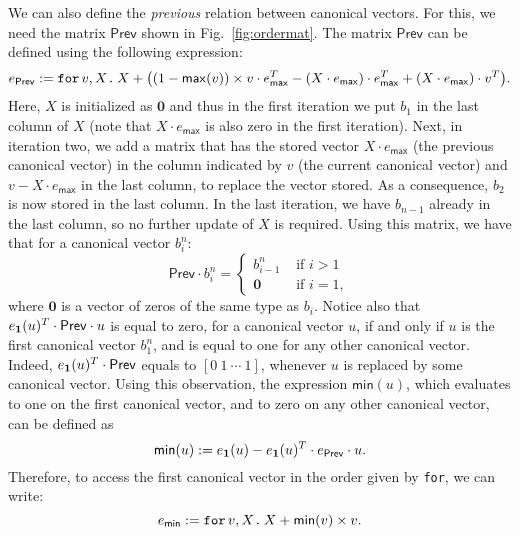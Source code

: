 We can also define the \textit{previous} relation between canonical vectors. For this, we need
the matrix $\mathsf{Prev}$ shown in Fig.~\ref{fig:ordermat}.
The matrix 
$\mathsf{Prev}$ can be defined using the following \langfor expression:
$$e_{\mathsf{Prev}}:= \texttt{for}\, v,X \texttt{.}\, X + \bigl((1 - \mathsf{max}(v))\times v\cdot e_{\mathsf{max}}^T - (X\cdot e_{\mathsf{max}})\cdot e_{\mathsf{max}}^T + (X\cdot e_{\mathsf{max}})\cdot v^T\bigr).$$
Here, $X$ is initialized as $\mathbf{0}$ and thus in the first iteration we put
 $b_1$ in the last column of $X$ (note that $X\cdot e_{\mathsf{max}}$ is also zero in the first iteration). Next, in iteration two, we add a matrix that has the stored vector $X\cdot e_{\mathsf{max}}$ (the previous canonical vector) in the column indicated by $v$ (the current canonical vector) and $v-X\cdot e_{\mathsf{max}}$ in the last column, to replace the vector stored. As a consequence, $b_2$ is now stored in the last column. In the last iteration, we have $b_{n-1}$ already in the last column, so no further update of $X$ is required.
Using this matrix, we have that for a canonical vector $b_i^n$:
\[
\mathsf{Prev}\cdot b_i^n=\begin{cases}
               b_{i-1}^n & \text{ if } i > 1 \\
              \mathbf{0} & \text{ if } i = 1,
            \end{cases}
\]
where $\mathbf{0}$ is a vector of zeros of the same type as $b_i$. Notice also that $e_{\mathbf{1}}(u)^T\cdot \mathsf{Prev} \cdot u$ is equal to zero, for a canonical vector $u$, if and only if $u$ is the first canonical vector $b_1^n$, and is equal to one for any other canonical vector. Indeed, $e_{\mathbf{1}}(u)^T\cdot \mathsf{Prev}$ equals to $[0\ 1\ \cdots\ 1]$, whenever $u$ is replaced by some canonical vector. Using this observation, the expression $\mathsf{min}(u)$, which evaluates to one on the first canonical vector, and to zero on any other canonical vector, can be  defined as $$\mathsf{min}(u) := e_{\mathbf{1}}(u) - e_{\mathbf{1}}(u)^T\cdot e_{\mathsf{Prev}} \cdot u.$$
Therefore, to access the first canonical vector in the order given by \texttt{for}, we can write:
$$e_{\mathsf{min}} := \texttt{for}\, v,X \texttt{.}\, X + \mathsf{min}(v)\times v.$$


